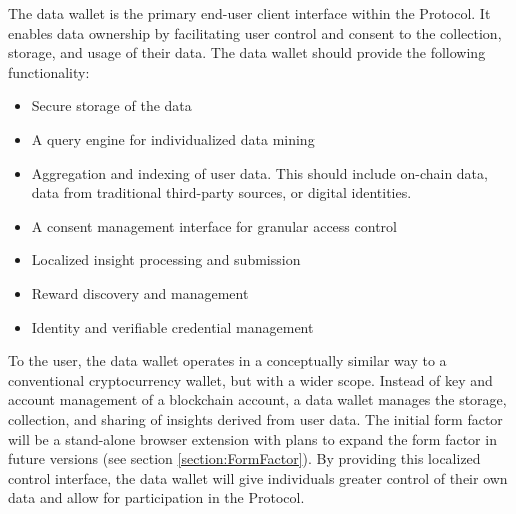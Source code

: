 



The data wallet is the primary end-user client interface within the Protocol. It enables data ownership by facilitating user control 
and consent to the collection, storage, and usage of their data. The data wallet should provide the following functionality:
\begin{itemize}
  \item Secure storage of the data
  \item A query engine for individualized data mining
  \item Aggregation and indexing of user data. This should include on-chain data, data from traditional third-party sources, or digital identities.
  \item A consent management interface for granular access control
  \item Localized insight processing and submission
  \item Reward discovery and management
  \item Identity and verifiable credential management
\end{itemize}


To the user, the data wallet operates in a conceptually similar way to a conventional cryptocurrency wallet, but with a wider scope. 
Instead of key and account management of a blockchain account, a data wallet manages the storage, collection, and sharing of insights derived 
from user data. The initial form factor will be a stand-alone browser extension with plans to expand the form factor in future versions (see 
section \ref{section:FormFactor}). By providing this localized control interface, the data wallet will give individuals greater control 
of their own data and allow for participation in the Protocol.


